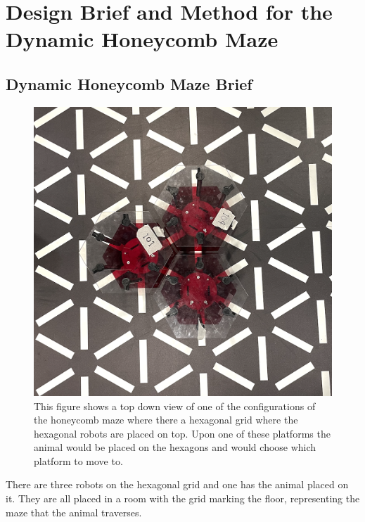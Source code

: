 \section{Design Brief and Method for the Dynamic Honeycomb Maze}



\subsection{Dynamic Honeycomb Maze Brief}
\label{section:design_brief}

\begin{figure}[h]
    \centering
    \includegraphics[scale=0.35]{images/irl_maze.png}
    \caption{This figure shows a top down view of one of the configurations of the honeycomb maze where there a hexagonal grid where the hexagonal robots are placed on top. Upon one of these platforms the animal would be placed on the hexagons and would choose which platform to move to.}
    \label{fig:picture_of_maze}
\end{figure}

There are three robots on the hexagonal grid and one has the animal placed on it. They are all placed in a room with the grid marking the floor, representing the maze that the animal traverses.

